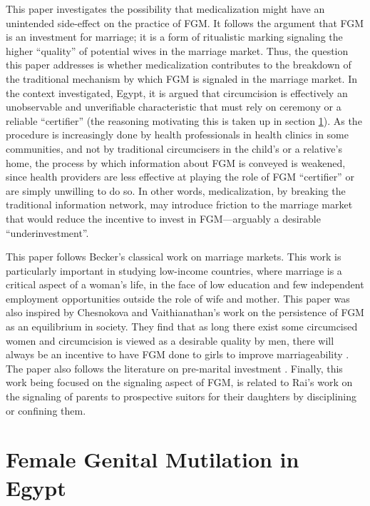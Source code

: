\documentclass[12pt]{article}
\begin{document}
This paper investigates the possibility that medicalization might have an unintended side-effect on the practice of FGM.  It follows the argument that FGM is an investment for marriage; it is a form of ritualistic marking signaling the higher ``quality'' of potential wives in the marriage market. Thus, the question this paper addresses is whether medicalization contributes to the breakdown of the traditional mechanism by which FGM is signaled in the marriage market.  In the context investigated, Egypt, it is argued that circumcision is effectively an unobservable and unverifiable characteristic that must rely on ceremony or a reliable ``certifier'' (the reasoning motivating this is taken up in section \ref{sec:fgmegypt}).  As the procedure is increasingly done by health professionals in health clinics in some communities, and not by traditional circumcisers in the child's or a relative's home, the process by which information about FGM is conveyed is weakened, since health providers are less effective at playing the role of FGM ``certifier'' or are simply unwilling to do so. In other words, medicalization, by breaking the traditional information network, may introduce friction to the marriage market that would reduce the incentive to invest in FGM---arguably a desirable ``underinvestment''.

This paper follows Becker's \citeyearpar{Becker1981} classical work on marriage markets.  This work is particularly important in studying low-income countries, where marriage is a critical aspect of a woman's life, in the face of low education and few independent employment opportunities outside the role of wife and mother. This paper was also inspired by Chesnokova and Vaithianathan's \citeyearpar{Chesnokova2007} work on the persistence of FGM as an equilibrium in society. They find that as long there exist some circumcised women and circumcision is viewed as a desirable quality by men, there will always be an incentive to have FGM done to girls to improve marriageability . The paper also follows the literature on pre-marital investment \citep{Burdett2001, Peters2002}. Finally, this work being focused on the signaling aspect of FGM, is related to Rai's \citeyearpar{Raia} work on the signaling of parents to prospective suitors for their daughters by disciplining or confining them. 

\section{Female Genital Mutilation in Egypt}\label{sec:fgmegypt}
\end{document}
